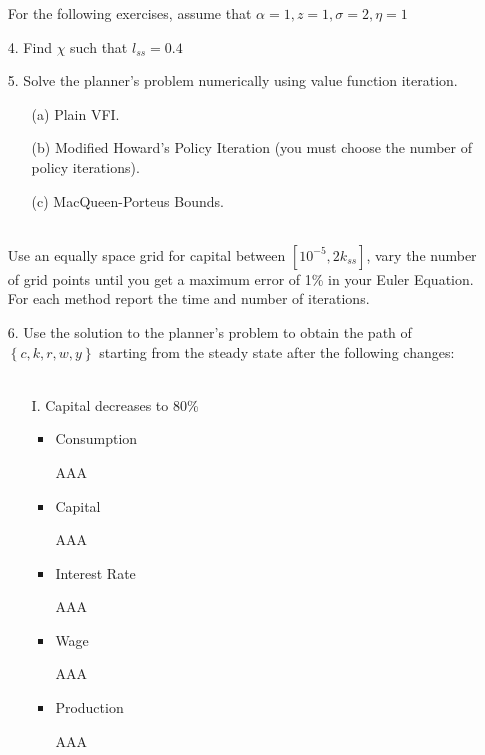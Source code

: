 \documentclass[a4paper]{article}
\begin{document}
\begin{enumerate}
For the  following exercises, assume that $\alpha=1, z=1, \sigma=2, \eta = 1$
\item[4.] Find $\chi$ such that $l_{ss} = 0.4$
\item[5.] Solve the planner's problem numerically using value function iteration.
\begin{enumerate}
\item[(a)] Plain VFI.
\item[(b)] Modified Howard’s Policy Iteration (you must choose the number of policy iterations).
\item[(c)] MacQueen-Porteus Bounds.\\~\
\end{enumerate}

Use an equally space grid for capital between $[10^{-5}, 2k_{ss}]$, vary the number of grid points until you get a maximum error of 1\% in your Euler Equation. For each method report the time and number of iterations.

\item[6.] Use the solution to the planner’s problem to obtain the path of $\left\lbrace c, k, r, w, y \right\rbrace$ starting from the steady state after the following changes: \\~\

\begin{enumerate}
\item[I.] Capital decreases to 80\%
\begin{itemize}
\item Consumption
\begin{center}
AAA
\end{center}
\clearpage
\item Capital
\begin{center}
AAA
\end{center}
\item Interest Rate
\begin{center}
AAA
\end{center}
\item Wage
\begin{center}
AAA
\end{center}
\clearpage
\item Production
\begin{center}
AAA
\end{center}

\end{itemize}


\end{enumerate}
\end{enumerate}
\end{document}
